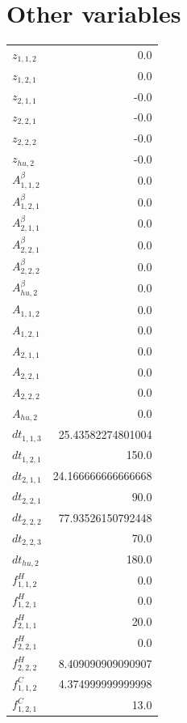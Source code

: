 \documentclass{article}%
\makeatletter
\let\mcnewpage=\newpage%
\newcommand{\TrickSupertabularIntoMulticols}{%
\renewcommand\newpage{%
\if@firstcolumn%
\hrule width\linewidth height0pt%
\columnbreak%
\else%
\mcnewpage%
\fi%
}%
}%
\makeatother
\begin{document}
\section{Other variables}%
\thispagestyle{plain}%
\begin{multicols*}{3}%
\TrickSupertabularIntoMulticols%
%
\begin{supertabular}{lr}%
	$z_{1,1,2}$ & 0.0 \\%
	$z_{1,2,1}$ & 0.0 \\%
	$z_{2,1,1}$ & -0.0 \\%
	$z_{2,2,1}$ & -0.0 \\%
	$z_{2,2,2}$ & -0.0 \\%
	$z_{hu,2}$ & -0.0 \\%
	$A_{1,1,2}^{\beta}$ & 0.0 \\%
	$A_{1,2,1}^{\beta}$ & 0.0 \\%
	$A_{2,1,1}^{\beta}$ & 0.0 \\%
	$A_{2,2,1}^{\beta}$ & 0.0 \\%
	$A_{2,2,2}^{\beta}$ & 0.0 \\%
	$A_{hu,2}^{\beta}$ & 0.0 \\%
	$A_{1,1,2}$ & 0.0 \\%
	$A_{1,2,1}$ & 0.0 \\%
	$A_{2,1,1}$ & 0.0 \\%
	$A_{2,2,1}$ & 0.0 \\%
	$A_{2,2,2}$ & 0.0 \\%
	$A_{hu,2}$ & 0.0 \\%
	$dt_{1,1,3}$ & 25.43582274801004 \\%
	$dt_{1,2,1}$ & 150.0 \\%
	$dt_{2,1,1}$ & 24.166666666666668 \\%
	$dt_{2,2,1}$ & 90.0 \\%
	$dt_{2,2,2}$ & 77.93526150792448 \\%
	$dt_{2,2,3}$ & 70.0 \\%
	$dt_{hu,2}$ & 180.0 \\%
	$f_{1,1,2}^{H}$ & 0.0 \\%
	$f_{1,2,1}^{H}$ & 0.0 \\%
	$f_{2,1,1}^{H}$ & 20.0 \\%
	$f_{2,2,1}^{H}$ & 0.0 \\%
	$f_{2,2,2}^{H}$ & 8.409090909090907 \\%
	$f_{1,1,2}^{C}$ & 4.374999999999998 \\%
	$f_{1,2,1}^{C}$ & 13.0 \\%

\end{supertabular}
\end{multicols*}
\end{document}
